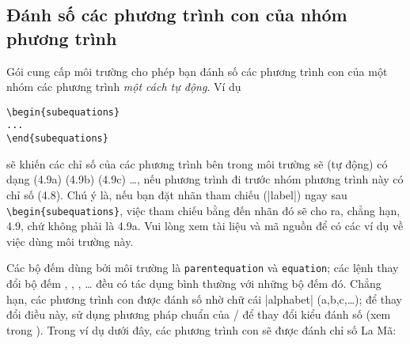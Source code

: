 \documentclass[11pt,leqno,titlepage,openany]{amsldoc}[1999/12/13]
\begin{document}
\subsection{Đánh số các phương trình con của nhóm phương trình}

Gói  cung cấp môi trường  cho phép
bạn đánh số các phương trình con của một nhóm các phương trình
\emph{một cách tự động}. Ví dụ

\medskip
\begin{verbatim}
\begin{subequations}
...
\end{subequations}
\end{verbatim}

\medskip
\noindent
sẽ khiến các chỉ số của các phương trình bên trong môi trường
 sẽ (tự động) có dạng (4.9a) (4.9b) (4.9c) \dots,
nếu phương trình đi trước nhóm phương trình này có chỉ số (4.8).
Chú ý là, nếu bạn đặt nhãn tham chiếu (|label|) ngay sau
\verb/\begin{subequations}/, việc tham chiếu bằng 
đến nhãn đó sẽ cho ra, chẳng hạn, 4.9, chứ không phải là 4.9a.
Vui lòng xem tài liệu  và mã nguồn 
để có các ví dụ về việc dùng môi trường này.

\medskip
Các bộ đếm dùng bởi môi trường  là \verb/parentequation/
và \verb/equation/; các lệnh thay đổi bộ đếm
, , , \ldots
đều có tác dụng bình thường với những bộ đếm đó.
Chẳng hạn, các phương trình con được đánh số nhờ chữ cái |alphabet|
(a,b,c,\ldots); để thay đổi điều này, sử dụng phương pháp chuẩn
của \latex/ để thay đổi kiểu đánh số (xem trong \cite[\S6.3, \S C.8.4]{lamport}).
Trong ví dụ dưới đây, các phương trình con sẽ được đánh chỉ số La Mã:
\end{document}
